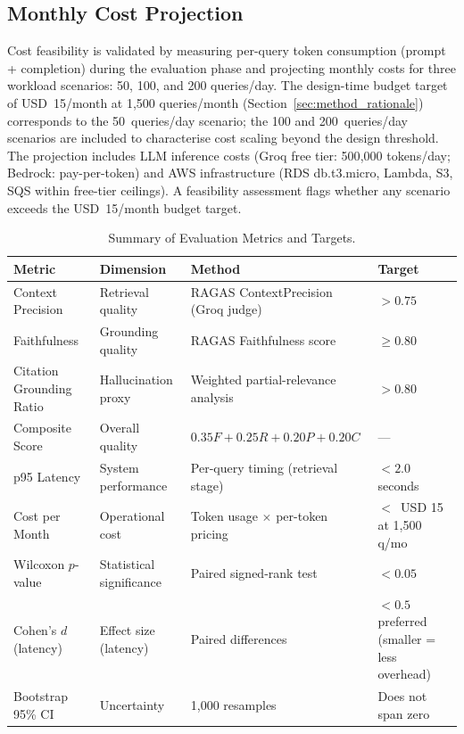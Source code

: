 \subsection{Monthly Cost Projection}
\label{sec:cost_projection}

Cost feasibility is validated by measuring per-query token consumption (prompt + completion) during the evaluation phase and projecting monthly costs for three workload scenarios: 50, 100, and 200 queries/day. The design-time budget target of USD~15/month at 1,500 queries/month (Section~\ref{sec:method_rationale}) corresponds to the 50~queries/day scenario; the 100 and 200~queries/day scenarios are included to characterise cost scaling beyond the design threshold. The projection includes LLM inference costs (Groq free tier: 500{,}000 tokens/day; Bedrock: pay-per-token) and AWS infrastructure (RDS db.t3.micro, Lambda, S3, SQS within free-tier ceilings). A feasibility assessment flags whether any scenario exceeds the USD~15/month budget target.

\begin{table}[H]
\caption{Summary of Evaluation Metrics and Targets.}
\label{tab:eval_targets}
\centering
\begin{tabular}{p{3.0cm}p{3.0cm}p{3.2cm}p{3.0cm}}
\toprule
\textbf{Metric} & \textbf{Dimension} & \textbf{Method} & \textbf{Target} \\
\midrule
Context Precision & Retrieval quality & RAGAS ContextPrecision (Groq judge) & $> 0.75$ \\
Faithfulness & Grounding quality & RAGAS Faithfulness score & $\geq 0.80$ \\
Citation Grounding Ratio & Hallucination proxy & Weighted partial-relevance analysis & $> 0.80$ \\
Composite Score & Overall quality & $0.35F + 0.25R + 0.20P + 0.20C$ & --- \\
p95 Latency & System performance & Per-query timing (retrieval stage) & $< 2.0$ seconds \\
Cost per Month & Operational cost & Token usage $\times$ per-token pricing & $<$~USD 15 at 1,500 q/mo \\
Wilcoxon $p$-value & Statistical significance & Paired signed-rank test & $< 0.05$ \\
Cohen's $d$ (latency) & Effect size (latency) & Paired differences & $< 0.5$ preferred (smaller = less overhead) \\
Bootstrap 95\% CI & Uncertainty & 1{,}000 resamples & Does not span zero \\
\bottomrule
\end{tabular}
\end{table}

